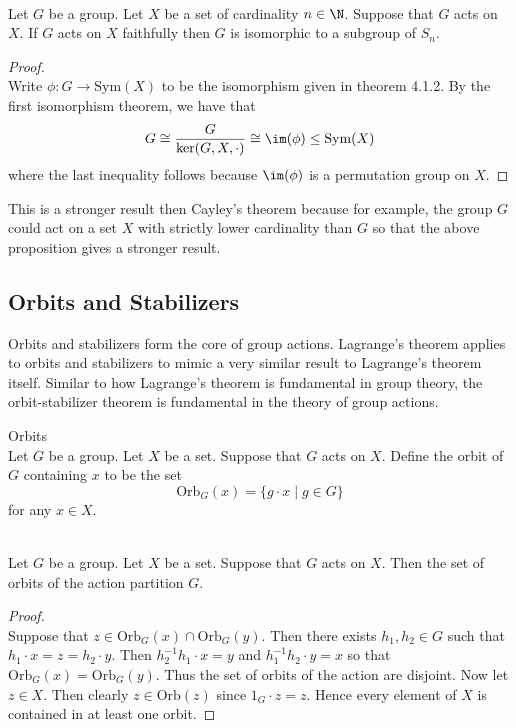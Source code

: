 \documentclass[a4paper]{article}
\begin{document}
\begin{prp}{}{}\\
Let $G$ be a group. Let $X$ be a set of cardinality $n\in\N$. Suppose that $G$ acts on $X$. If $G$ acts on $X$ faithfully then $G$ is isomorphic to a subgroup of $S_n$. 
\begin{proof}\\
Write $\phi:G\to\text{Sym}(X)$ to be the isomorphism given in theorem 4.1.2. By the first isomorphism theorem, we have that $$G\cong\frac{G}{\ker(G,X,\cdot)}\cong\im(\phi)\leq\text{Sym}(X)$$ where the last inequality follows because $\im(\phi)$ is a permutation group on $X$. 
\end{proof}
\end{prp}

This is a stronger result then Cayley's theorem because for example, the group $G$ could act on a set $X$ with strictly lower cardinality than $G$ so that the above proposition gives a stronger result. 

\subsection{Orbits and Stabilizers}
Orbits and stabilizers form the core of group actions. Lagrange's theorem applies to orbits and stabilizers to mimic a very similar result to Lagrange's theorem itself. Similar to how Lagrange's theorem is fundamental in group theory, the orbit-stabilizer theorem is fundamental in the theory of group actions. 

\begin{defn}{Orbits}{}\\
Let $G$ be a group. Let $X$ be a set. Suppose that $G$ acts on $X$. Define the orbit of $G$ containing $x$ to be the set $$\text{Orb}_G(x)=\{g\cdot x\;|\; g\in G\}$$ for any $x\in X$. 
\end{defn}

\begin{lmm}{}{}\\
Let $G$ be a group. Let $X$ be a set. Suppose that $G$ acts on $X$. Then the set of orbits of the action partition $G$. 
\begin{proof}\\
Suppose that $z\in\text{Orb}_G(x)\cap\text{Orb}_G(y)$. Then there exists $h_1,h_2\in G$ such that $h_1\cdot x=z=h_2\cdot y$. Then $h_2^{-1}h_1\cdot x=y$ and $h_1^{-1}h_2\cdot y=x$ so that $\text{Orb}_G(x)=\text{Orb}_G(y)$. Thus the set of orbits of the action are disjoint. Now let $z\in X$. Then clearly $z\in\text{Orb}(z)$ since $1_G\cdot z=z$. Hence every element of $X$ is contained in at least one orbit. 
\end{proof}
\end{lmm}
\end{document}
